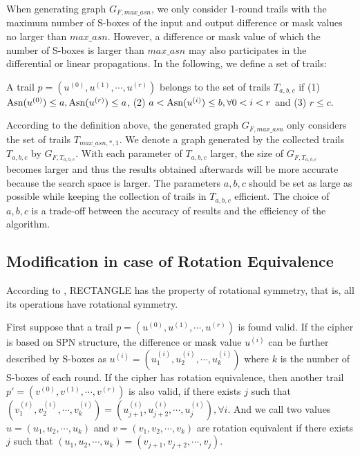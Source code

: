 When generating graph $G_{F,max\_asn}$, we only consider 1-round trails with the maximum number of S-boxes of the input and output difference or mask values no larger than $max\_asn$. However, a difference or mask value of which the number of S-boxes is larger than $max\_asn$ may also participates in the differential or linear propagations. In the following, we define a set of trails:

\begin{definition}
	A trail $p=(u^{(0)},u^{(1)},\cdots,u^{(r)})$ belongs to the set of trails $T_{a,b,c}$ if (1) $\text{Asn}(u^{(0)})\leq a,\text{Asn}(u^{(r)})\leq a$, (2) $a< \text{Asn}(u^{(i)})\leq b,\forall 0<i<r$ and (3) $r\leq c$.
\end{definition}

According to the definition above, the generated graph $G_{F,max\_asn}$ only considers the set of trails $T_{max\_asn,*,1}$. We denote a graph generated by the collected trails $T_{a,b,c}$ by $G_{F,T_{a,b,c}}$. With each parameter of $T_{a,b,c}$ larger, the size of $G_{F,T_{a,b,c}}$ becomes larger and thus the results obtained afterwards will be more accurate because the search space is larger. The parameters $a,b,c$ should be set as large as possible while keeping the collection of trails in $T_{a,b,c}$ efficient. The choice of $a,b,c$ is a trade-off between the accuracy of results and the efficiency of the algorithm.

\subsection{Modification in case of Rotation Equivalence}

According to \cite{ZBL15}, RECTANGLE has the property of rotational symmetry, that is, all its operations have rotational symmetry. 

\begin{definition}
	First suppose that a trail $p=(u^{(0)},u^{(1)},\cdots,u^{(r)})$ is found valid. If the cipher is based on SPN structure, the difference or mask value $u^{(i)}$ can be further described by S-boxes as $u^{(i)}=(u_1^{(i)},u_2^{(i)},\cdots,u_k^{(i)})$ where $k$ is the number of S-boxes of each round. If the cipher has rotation equivalence, then another trail $p'=(v^{(0)},v^{(1)},\cdots,v^{(r)})$ is also valid, if there exists $j$ such that $(v_1^{(i)},v_2^{(i)},\cdots,v_k^{(i)})=(u_{j+1}^{(i)},u_{j+2}^{(i)},\cdots,u_{j}^{(i)}),\forall i$. And we call two values $u=(u_1,u_2,\cdots,u_k)$ and $v=(v_1,v_2,\cdots,v_k)$ are rotation equivalent if there exists $j$ such that $(u_1,u_2,\cdots,u_k)=(v_{j+1},v_{j+2},\cdots,v_{j})$. 
\end{definition}

